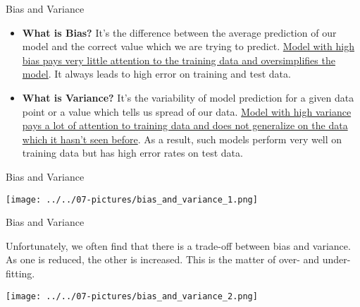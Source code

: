 \documentclass[11pt]{beamer}
\begin{document}
\begin{frame}{Bias and Variance}

\begin{itemize}

\item \textbf{What is Bias?} It's the difference between the average prediction of our model and the correct value which we are trying to predict. \ul{Model with high bias pays very little attention to the training data and oversimplifies the model}. It always leads to high error on training and test data.

\item \textbf{What is Variance?} It's the variability of model prediction for a given data point or a value which tells us spread of our data. \ul{Model with high variance pays a lot of attention to training data and does not generalize on the data which it hasn't seen before}. As a result, such models perform very well on training data but has high error rates on test data.

\end{itemize}

\end{frame}
\begin{frame}{Bias and Variance}
\begin{center}
\texttt{[image: ../../07-pictures/bias\_and\_variance\_1.png]}  
\end{center}
\end{frame}
\begin{frame}{Bias and Variance}
\begin{tcolorbox}
Unfortunately, we often find that there is a trade-off between bias and variance. As one is reduced, the other is increased. This is the matter of over- and under-fitting.
\end{tcolorbox}
\begin{center}
\texttt{[image: ../../07-pictures/bias\_and\_variance\_2.png]} 
\end{center}
\end{frame}
%
\end{document}
